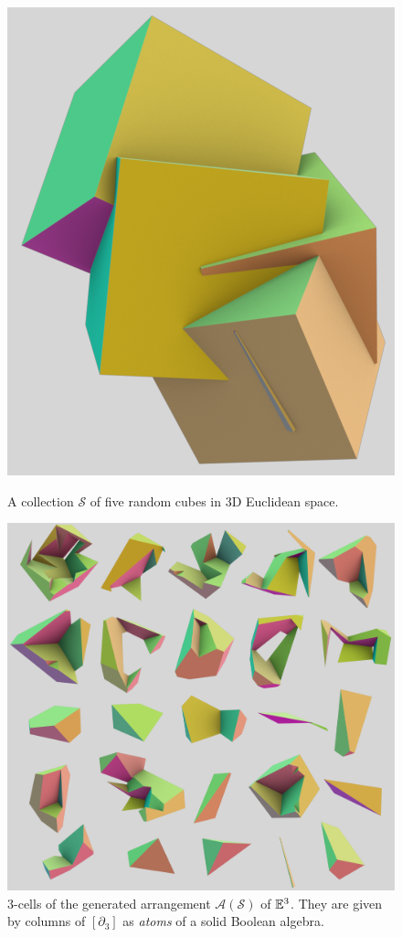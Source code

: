 \begin{figure}[htbp]
    \centering
    \begin{minipage}{0.475\textwidth}
        \centering
       \includegraphics[width=0.6\linewidth]{../figs/image1.png} 
       \caption{A collection $\mathcal{S}$ of five random cubes in 3D Euclidean space.}
       \label{fig:image1}
    \end{minipage}\hfill
    \begin{minipage}{0.475\textwidth}
        \centering
       \includegraphics[width=0.8\linewidth]{../figs/image2.png} 
        \caption{3-cells of the generated arrangement $\mathcal{A}(\mathcal{S})$ of $\mathbb{E}^3$.
        They are given by columns of $[\partial_3]$ as \emph{atoms} of a solid Boolean algebra.}
       \label{fig:image2}
    \end{minipage}
\end{figure}


